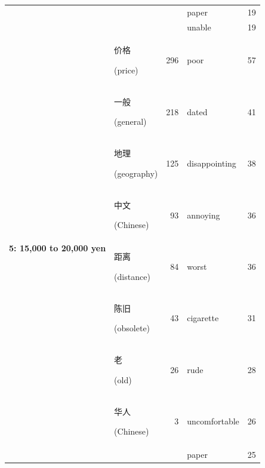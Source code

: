 \documentclass[smallextended,natbib]{svjour3}       %
\begin{document}
\begin{table}[ht]
{\begin{tabular}{|c|lr|lr|}
                                                             &                                                &      & paper          & 19  \\  
                                                             &                                                &      & unable         & 19  \\ \hline
        \multirow{10}{*}{\textbf{5: 15,000 to 20,000 yen}}   & \begin{CJK}{UTF8}{gbsn}价格\end{CJK} (price)     & 296  & poor           & 57  \\  
                                                             & \begin{CJK}{UTF8}{gbsn}一般\end{CJK} (general)   & 218  & dated          & 41  \\  
                                                             & \begin{CJK}{UTF8}{gbsn}地理\end{CJK} (geography) & 125  & disappointing  & 38  \\  
                                                             & \begin{CJK}{UTF8}{gbsn}中文\end{CJK} (Chinese)   & 93   & annoying       & 36  \\  
                                                             & \begin{CJK}{UTF8}{gbsn}距离\end{CJK} (distance)  & 84   & worst          & 36  \\  
                                                             & \begin{CJK}{UTF8}{gbsn}陈旧\end{CJK} (obsolete)  & 43   & cigarette      & 31  \\  
                                                             & \begin{CJK}{UTF8}{gbsn}老\end{CJK} (old)        & 26   & rude           & 28  \\  
                                                             & \begin{CJK}{UTF8}{gbsn}华人\end{CJK} (Chinese)   & 3    & uncomfortable  & 26  \\  
                                                             &                                                &      & paper          & 25  \\  

\end{tabular}}
\end{table}
\end{document}
